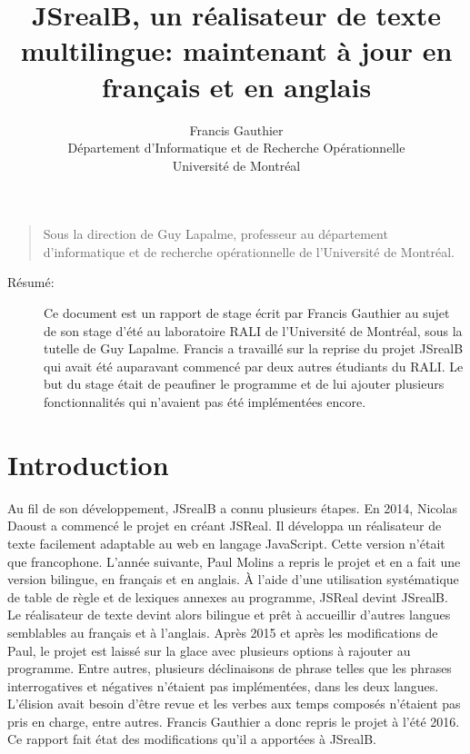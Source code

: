 \documentclass[11pt]{article} %
\title{JSrealB, un réalisateur de texte multilingue: maintenant à jour en
français et en anglais}
\author{Francis Gauthier\\Département d'Informatique et de Recherche Opérationnelle\\Université de Montréal}
\begin{document}
\maketitle


\begin{verse}
Sous la direction de Guy Lapalme, professeur au département d'informatique
et de recherche opérationnelle de l'Université de Montréal.
\end{verse}
\begin{description}
\item [{Résumé:}] Ce document est un rapport de stage écrit par Francis
Gauthier au sujet de son stage d'été au laboratoire RALI de l'Université
de Montréal, sous la tutelle de Guy Lapalme. Francis a travaillé sur
la reprise du projet JSrealB qui avait été auparavant commencé par
deux autres étudiants du RALI. Le but du stage était de peaufiner
le programme et de lui ajouter plusieurs fonctionnalités qui n'avaient
pas été implémentées encore. 
\end{description}



\pagebreak
\begin{verse}
\tableofcontents{}
\end{verse}
\pagebreak


\section{Introduction}

Au fil de son développement, JSrealB a connu plusieurs étapes. En
2014, Nicolas Daoust a commencé le projet en créant JSReal. Il développa
un réalisateur de texte facilement adaptable au web en langage JavaScript.
Cette version n'était que francophone. L'année suivante, Paul Molins
a repris le projet et en a fait une version bilingue, en français
et en anglais. À l'aide d'une utilisation systématique de table de
règle et de lexiques annexes au programme, JSReal devint JSrealB.
Le réalisateur de texte devint alors bilingue et prêt à accueillir
d'autres langues semblables au français et à l'anglais. Après 2015
et après les modifications de Paul, le projet est laissé sur la glace
avec plusieurs options à rajouter au programme. Entre autres, plusieurs
déclinaisons de phrase telles que les phrases interrogatives et négatives
n'étaient pas implémentées, dans les deux langues. L'élision avait
besoin d'être revue et les verbes aux temps composés n'étaient pas
pris en charge, entre autres. Francis Gauthier a donc repris le projet
à l'été 2016. Ce rapport fait état des modifications qu'il a apportées
à JSrealB.
\end{document}
